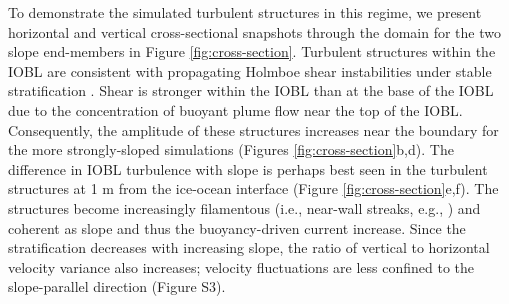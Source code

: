 \documentclass[draft]{agujournal2019}
\begin{document}
To demonstrate the simulated turbulent structures in this regime, we present horizontal and vertical cross-sectional  snapshots through the domain for the two slope end-members in Figure \ref{fig:cross-section}. Turbulent structures within the IOBL are consistent with propagating Holmboe shear instabilities under stable stratification \cite{carpenter_identifying_2010}. Shear is stronger within the IOBL than at the base of the IOBL due to the concentration of buoyant plume flow near the top of the IOBL. Consequently, the amplitude of these structures increases near the boundary for the more strongly-sloped simulations (Figures \ref{fig:cross-section}b,d). The difference in IOBL turbulence with slope is perhaps best seen in the turbulent structures at 1 m from the ice-ocean interface (Figure \ref{fig:cross-section}e,f). The structures become increasingly filamentous (i.e., near-wall streaks, e.g., ) and coherent as slope and thus the buoyancy-driven current increase. Since the stratification decreases with increasing slope, the ratio of vertical to horizontal velocity variance also increases;  velocity fluctuations are less confined to the slope-parallel direction (Figure S3).
\end{document}
